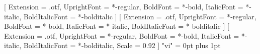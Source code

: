 
\usepackage{fontspec}
\setmainfont{texgyretermes}[              %
  Extension      = .otf,
  UprightFont    = *-regular,
  BoldFont       = *-bold,
  ItalicFont     = *-italic,
  BoldItalicFont = *-bolditalic ]
\setsansfont{texgyreheros}[               %
  Extension      = .otf,
  UprightFont    = *-regular,
  BoldFont       = *-bold,
  ItalicFont     = *-italic,
  BoldItalicFont = *-bolditalic ]
\setmonofont{texgyrecursor}[
  Extension      = .otf,
  UprightFont    = *-regular,
  BoldFont       = *-bold,
  ItalicFont     = *-italic,
  BoldItalicFont = *-bolditalic,
  Scale          = 0.92 ]
\XeTeXlinebreaklocale "vi"
\XeTeXlinebreakskip = 0pt plus 1pt

\usepackage[fontsize=13pt]{fontsize}

\usepackage[a4paper,left=3cm,right=2cm,top=2cm,bottom=2cm]{geometry}

\usepackage{setspace}
\onehalfspacing

\usepackage{graphicx}
\usepackage[table]{xcolor}
\usepackage{array}
\usepackage{booktabs}
\usepackage{tabularx}
\usepackage{longtable}
\usepackage{multirow}
\usepackage{enumitem}
\usepackage{float}
\usepackage{amsmath}
\usepackage{amssymb}
\usepackage{ragged2e}

\sloppy

\usepackage{caption}
\captionsetup{labelsep=colon,font=normalsize,labelfont=bf,justification=centering}
\captionsetup[table]{position=below,skip=4pt}
\captionsetup[figure]{position=below,skip=4pt}

